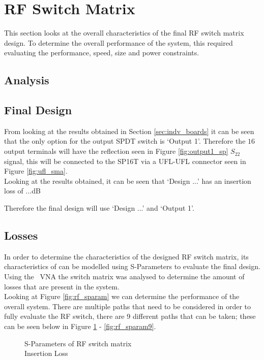\documentclass[12pt,openany,a4paper]{book}
\begin{document}
\section{RF Switch Matrix}
This section looks at the overall characteristics of the final RF switch matrix design. To determine the overall performance of the system, this required evaluating the performance, speed, size and power constraints.

\subsection{Analysis}

\subsection{Final Design}
From looking at the results obtained in Section \ref{sec:indv_boards} it can be seen that the only option for the output SPDT switch is `Output 1'. Therefore the $16$ output terminals will have the reflection seen in Figure \ref{fig:output1_sp} $S_{22}$ signal, this will be connected to the SP16T via a UFL-UFL connector seen in Figure \ref{fig:ufl_sma}. \\
Looking at the results obtained, it can be seen that `Design ...' has an insertion loss of ...dB 


Therefore the final design will use  `Design ...' and `Output 1'. 

\subsection{Losses}
In order to determine the characteristics of the designed RF switch matrix, its characteristics of can be modelled using S-Parameters to evaluate the final design. Using the \model \ VNA the switch matrix was analysed to determine the amount of losses that are present in the system. \\
Looking at Figure \ref{fig:rf_sparam} we can determine the performance of the overall system. There are multiple paths that need to be considered in order to fully evaluate the RF switch, there are 9 different paths that can be taken; these can be seen below in Figure \ref{fig:rf_sparam1} - \ref{fig:rf_sparam9}.

\begin{figure}[H]
	\centering
	\caption{S-Parameters of RF switch matrix \\ Insertion Loss}
	\label{fig:rf_sparam1}
\end{figure} 
\end{document}

